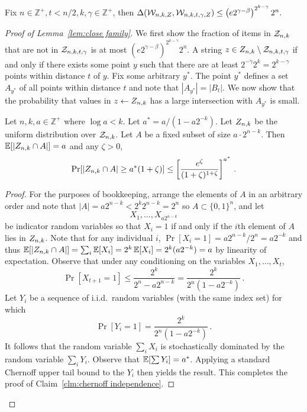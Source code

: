 

 \begin{lemma}
 \label{lem:close family}
Fix $n\in \mathbb{Z}^+, t<n/2, k, \gamma  \in \mathbb{Z}^+$, then
$\Delta(\mathcal{W}_{n,k, Z}, \mathcal{W}_{n,k,t,\gamma, Z}) \le \left(e2^{\gamma-\beta}\right)^{2^{k-\gamma}}2^n.$
\end{lemma}

\begin{proof}[Proof of Lemma~\ref{lem:close family}]
We first show the fraction of items in $\mathcal{Z}_{n,k}$ that are not in $\mathcal{Z}_{n,k,t,\gamma}$ is at most $\left(e2^{\gamma-\beta}\right)^{2^{k-\gamma}}2^n$.  
A string $z\in Z_{n,k}\setminus \mathcal{Z}_{n,k,t,\gamma}$ if and only if there exists some point $y$ such that there are at least $2^{-\gamma}2^k = 2^{k-\gamma}$ points within distance $t$ of $y$.  Fix some arbitrary $y^*$. The point $y^*$ defines a set $A_{y^*}$ of all points within distance $t$ and note that $|A_{y^*}| = |B_t|$.  We now show that the probability that values in $z\leftarrow Z_{n,k}$ has a large intersection with $A_{y^*}$ is small.  

  \begin{claim}
  \label{clm:chernoff independence}
  Let $n,k,a\in\mathbb{Z}^+$ where $\log a < k$.  Let $a^* = a/(1 - a2^{-k})$. Let $Z_{n,k}$
  be the uniform distribution over $\mathcal{Z}_{n,k}$. Let $A$ be a fixed subset of size $a \cdot 2^{n-k}$. Then
  $\operatorname*{\mathbb{E}}[|Z_{n,k} \cap A|] = a$ and any $\zeta > 0$,
  \[
    \Pr[|Z_{n,k} \cap A| \geq a^*(1 + \zeta)] \leq \left[\frac{e^\zeta}{(1+\zeta)^{1+\zeta}}\right]^{a^*}\,.
  \]
\end{claim}
\begin{proof}
  For the purposes of bookkeeping, arrange the elements of $A$ in an
  arbitrary order and note that $|A| = a2^{n-k} < 2^k2^{n-k} = 2^n$ so $A\subset \{0,1\}^n$, and let
  \[
    X_1, \ldots, X_{a2^{n-k}}
  \]
  be indicator random variables so that $X_i = 1$ if and only if the
  $i$th element of $A$ lies in $Z_{n,k}$.  Note that for any individual $i$, $\Pr[X_i =1] =a2^{n-k}/2^n = a2^{-k}$ and thus $\operatorname*{\mathbb{E}}[|Z_{n,k}\cap A|] =\sum_i \operatorname*{\mathbb{E}}[X_i] = 2^k \operatorname*{\mathbb{E}}[X_i] =2^k (a2^{-k})= a$ by linearity of expectation.  Observe that under any conditioning on the
  variables $X_1, \ldots, X_t$,
  \[
    \Pr[X_{t+1} = 1] \leq \frac{2^k}{2^n - a2^{n-k}} = \frac{2^k}{2^n(1 - a2^{-k})}\,.
  \]
   Let $Y_i$ be a sequence of
  i.i.d.\ random variables (with the same index set) for which
  \[
    \Pr[Y_i = 1] = \frac{2^{k}}{2^n(1 - a2^{-k})}\,.
  \]It follows that the random variable $\sum_i X_i$ is stochastically
  dominated by the random variable $\sum_i Y_i$. Observe that
  $\operatorname*{\mathbb{E}}[\sum Y_i] = a^*$. Applying a standard Chernoff upper tail
  bound to the $Y_i$ then yields the result. This completes the proof of Claim~\ref{clm:chernoff independence}.
\end{proof}


\end{proof}
